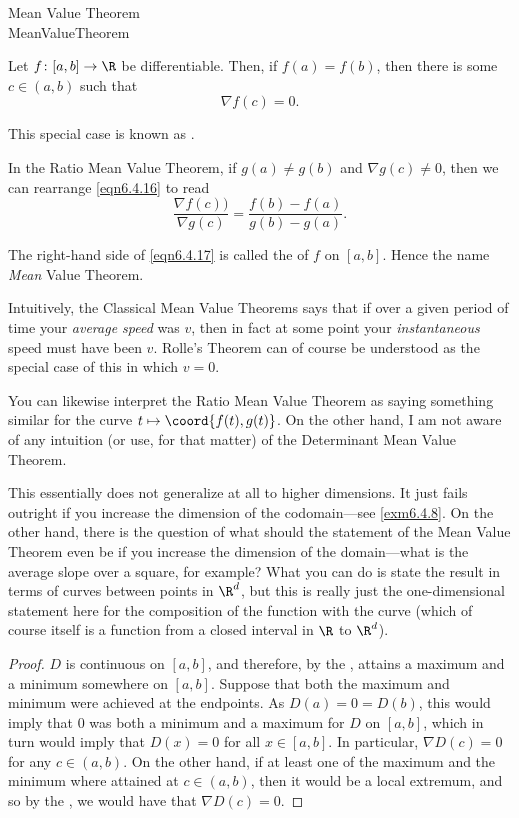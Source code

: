 \begin{thm}{Mean Value Theorem \\}{MeanValueTheorem}
\begin{rmk}
Let $f\colon [a,b]\rightarrow \R$ be differentiable.  Then, if $f(a)=f(b)$, then there is some $c\in (a,b)$ such that
\begin{equation}
\nabla f(c)=0.
\end{equation}

This special case is known as .
\end{rmk}
\begin{rmk}
In the Ratio Mean Value Theorem, if $g(a)\neq g(b)$ and $\nabla g(c)\neq 0$, then we can rearrange \eqref{eqn6.4.16} to read
\begin{equation}
\frac{\nabla f(c))}{\nabla g(c)}=\frac{f(b)-f(a)}{g(b)-g(a)}.
\end{equation}
\end{rmk}
\begin{rmk}
The right-hand side of \eqref{eqn6.4.17} is called the  of $f$ on $[a,b]$.  Hence the name \emph{Mean} Value Theorem.
\end{rmk}
\begin{rmk}
Intuitively, the Classical Mean Value Theorems says that if over a given period of time your \emph{average speed} was $v$, then in fact at some point your \emph{instantaneous} speed must have been $v$.  Rolle's Theorem can of course be understood as the special case of this in which $v=0$.

You can likewise interpret the Ratio Mean Value Theorem as saying something similar for the curve $t\mapsto \coord{f(t),g(t)}$.  On the other hand, I am not aware of any intuition (or use, for that matter) of the Determinant Mean Value Theorem.
\end{rmk}
\begin{rmk}
This essentially does not generalize at all to higher dimensions.  It just fails outright if you increase the dimension of the codomain---see \cref{exm6.4.8}.  On the other hand, there is the question of what should the statement of the Mean Value Theorem even be if you increase the dimension of the domain---what is the average slope over a square, for example?  What you can do is state the result in terms of curves between points in $\R ^d$, but this is really just the one-dimensional statement here for the composition of the function with the curve (which of course itself is a function from a closed interval in $\R$ to $\R ^d$).
\end{rmk}
\begin{proof}
$D$ is continuous on $[a,b]$, and therefore, by the , attains a maximum and a minimum somewhere on $[a,b]$.  Suppose that both the maximum and minimum were achieved at the endpoints.  As $D(a)=0=D(b)$, this would imply that $0$ was both a minimum and a maximum for $D$ on $[a,b]$, which in turn would imply that $D (x)=0$ for all $x\in [a,b]$.  In particular, $\nabla D(c)=0$ for any $c\in (a,b)$.  On the other hand, if at least one of the maximum and the minimum where attained at $c\in (a,b)$, then it would be a local extremum, and so by the , we would have that $\nabla D(c)=0$.
\end{proof}
\end{thm}

